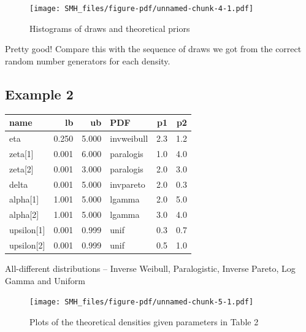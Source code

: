 \documentclass[
  letterpaper,
]{book}
\begin{document}
\begin{figure}

{\centering \texttt{[image: SMH\_files/figure-pdf/unnamed-chunk-4-1.pdf]}

}

\caption{Histograms of draws and theoretical priors}

\end{figure}

Pretty good! Compare this with the sequence of draws we got from the
correct random number generators for each density.

\hypertarget{example-2}{%
\subsection{Example 2}\label{example-2}}

\begin{table}
\centering
\begin{tabular}{l|r|r|l|r|r}
\hline
name & lb & ub & PDF & p1 & p2\\
\hline
eta & 0.250 & 5.000 & invweibull & 2.3 & 1.2\\
\hline
zeta[1] & 0.001 & 6.000 & paralogis & 1.0 & 4.0\\
\hline
zeta[2] & 0.001 & 3.000 & paralogis & 2.0 & 3.0\\
\hline
delta & 0.001 & 5.000 & invpareto & 2.0 & 0.3\\
\hline
alpha[1] & 1.001 & 5.000 & lgamma & 2.0 & 5.0\\
\hline
alpha[2] & 1.001 & 5.000 & lgamma & 3.0 & 4.0\\
\hline
upsilon[1] & 0.001 & 0.999 & unif & 0.3 & 0.7\\
\hline
upsilon[2] & 0.001 & 0.999 & unif & 0.5 & 1.0\\
\hline
\end{tabular}
\end{table}

All-different distributions -- Inverse Weibull, Paralogistic, Inverse
Pareto, Log Gamma and Uniform

\begin{figure}

{\centering \texttt{[image: SMH\_files/figure-pdf/unnamed-chunk-5-1.pdf]}

}

\caption{Plots of the theoretical densities given parameters in Table 2}

\end{figure}
\end{document}

